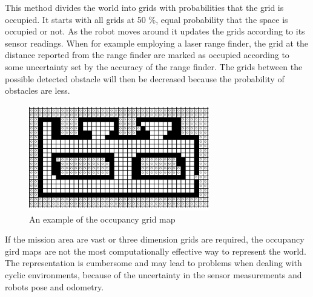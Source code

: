 This method divides the world into grids with probabilities that the grid is occupied. It
starts with all grids at 50 \%, equal probability that the space is occupied or not. As
the robot moves around it updates the grids according to its sensor readings. When for
example employing a laser range finder, the grid at the distance reported from the range
finder are marked as occupied according to some uncertainty set by the accuracy of the
range finder. The grids between the possible detected obstacle will then be decreased
because the probability of obstacles are less. 
\begin{figure}[htbp]
    \centering
    \includegraphics[width=0.7\textwidth]{pics/occupancy-grid}
    \caption{An example of the occupancy grid map}
    \label{chap2:fig-occupancy-grid}
\end{figure}

If the mission area are vast or three dimension grids are required, the occupancy gird maps 
are not the most computationally effective way to represent the world.
The representation is cumbersome and may lead to problems when dealing with
cyclic environments, because of the uncertainty in the sensor measurements and robots
pose and odometry. 


